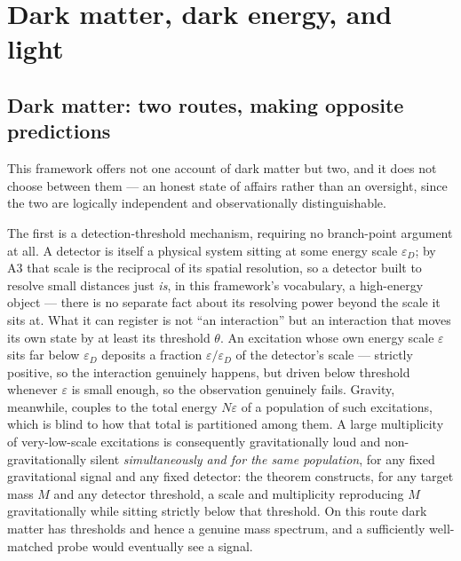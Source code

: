 \documentclass[pdflatex,sn-mathphys-num]{sn-jnl}
\theoremstyle{thmstyleone}
\theoremstyle{thmstylethree}
\theoremstyle{thmstyletwo}
\begin{document}
\section{Dark matter, dark energy, and light}\label{sec:cosmology}

\subsection{Dark matter: two routes, making opposite predictions}

This framework offers not one account of dark matter but two, and it
does not choose between them — an honest state of affairs rather than an
oversight, since the two are logically independent and observationally
distinguishable.

The first is a detection-threshold mechanism, requiring no branch-point
argument at all. A detector is itself a physical system sitting at some
energy scale $\varepsilon_D$; by A3 that scale is the reciprocal of its
spatial resolution, so a detector built to resolve small distances just
\emph{is}, in this framework's vocabulary, a high-energy object — there
is no separate fact about its resolving power beyond the scale it sits
at. What it can register is not ``an interaction''
but an interaction that moves its own state by at least its threshold
$\theta$. An excitation whose own energy scale $\varepsilon$ sits far
below $\varepsilon_D$ deposits a fraction $\varepsilon/\varepsilon_D$ of
the detector's scale — strictly positive, so the interaction genuinely
happens, but driven below threshold whenever $\varepsilon$ is small
enough, so the observation genuinely fails. Gravity, meanwhile, couples
to the total energy $N\varepsilon$ of a population of such excitations,
which is blind to how that total is partitioned among them. A large
multiplicity of very-low-scale excitations is consequently
gravitationally loud and non-gravitationally silent \emph{simultaneously
and for the same population}, for any fixed gravitational signal and any
fixed detector: the theorem constructs, for any target mass $M$ and any
detector threshold, a scale and multiplicity reproducing $M$
gravitationally while sitting strictly below that threshold. On this
route dark matter has thresholds and hence a genuine mass spectrum, and
a sufficiently well-matched probe would eventually see a signal.
\end{document}
